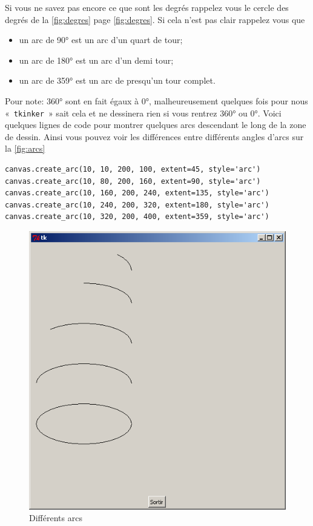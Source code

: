 Si vous ne savez pas encore ce que sont les degrés rappelez vous le cercle des degrés de la \autoref{fig:degres} page \autoref{fig:degres}. Si cela n'est pas clair rappelez vous que
\begin{itemize}
\item un arc de 90° est un arc d'un quart de tour;
\item un arc de 180° est un arc d'un demi tour;
\item un arc de 359° est un arc de presqu'un tour complet.
\end{itemize}

Pour note: 360° sont en fait égaux à 0°, malheureusement quelques fois pour nous « \texttt{tkinker} » sait cela et ne dessinera rien si vous rentrez 360° ou 0°. Voici quelques lignes de code pour montrer quelques arcs descendant le long de la zone de dessin. Ainsi vous pouvez voir les différences entre différents angles d'arcs sur la \autoref{fig:arcs}
\begin{Verbatim}[frame=single,rulecolor=\color{mbleu}, label=à taper]
canvas.create_arc(10, 10, 200, 100, extent=45, style='arc')
canvas.create_arc(10, 80, 200, 160, extent=90, style='arc')
canvas.create_arc(10, 160, 200, 240, extent=135, style='arc')
canvas.create_arc(10, 240, 200, 320, extent=180, style='arc')
canvas.create_arc(10, 320, 200, 400, extent=359, style='arc')
\end{Verbatim}

\begin{figure}[h!]
\centering
\includegraphics[scale=0.4]{images/arcs}
\caption{Différents arcs}\label{fig:arcs}
\end{figure}


